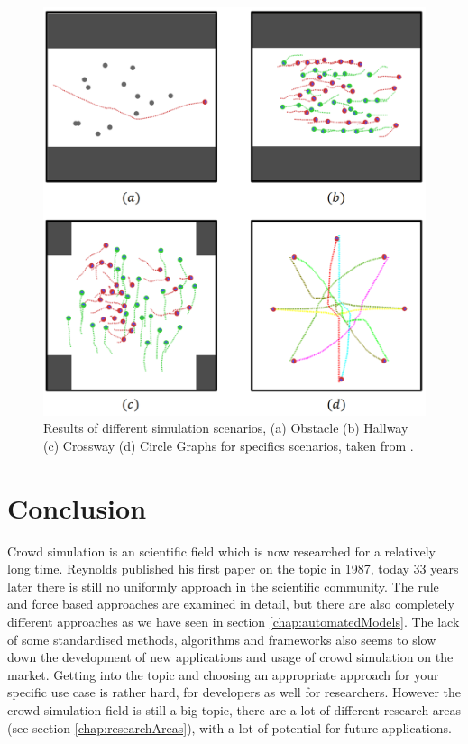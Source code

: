 \documentclass{acmsiggraph}               %
\begin{document}
\begin{figure}
  \centering
  \includegraphics[width=1\linewidth]{images/aiSituations.png}
  \caption{Results of different simulation scenarios, (a) Obstacle (b) Hallway (c) Crossway (d) Circle  Graphs for specifics scenarios, taken from \protect\cite{lee_crowd_2018}.}
  \label{fig:aiScenarios}
\end{figure}

\section{Conclusion}
Crowd simulation is an scientific field which is now researched for a relatively long time. Reynolds published his first paper on the topic in 1987, today 33 years later there is still no uniformly approach in the scientific community. The rule and force based approaches are examined in detail, but there are also completely different approaches as we have seen in section \ref{chap:automatedModels}. 
The lack of some standardised methods, algorithms and frameworks also seems to slow down the development of new applications and usage of crowd simulation on the market. Getting into the topic and choosing an appropriate approach for your specific use case is rather hard, for developers as well for researchers.
However the crowd simulation field is still a big topic, there are a lot of different research areas (see section \ref{chap:researchAreas}), with a lot of potential for future applications.
\end{document}
